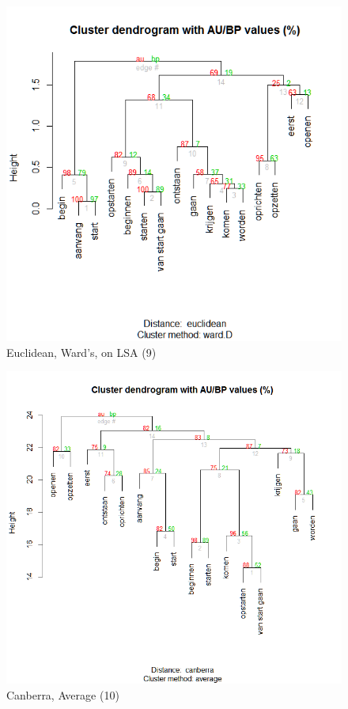 \begin{figure}
\includegraphics[height=.3\textheight]{figures/Vandevoorde2-img38.png}
\caption{\label{fig:key:38}  Euclidean, Ward’s, on LSA (9)}
\end{figure}

\begin{figure}
\includegraphics[height=.3\textheight]{figures/Vandevoorde2-img39.png}
\caption{\label{fig:key:39}  Canberra, Average (10)}
\end{figure}

